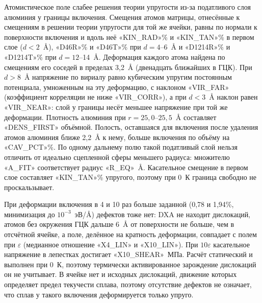 Атомистическое поле слабее решения теории упругости из-за податливого слоя
алюминия у границы включения. Смещения атомов
матрицы, отнесённые к смещениям в решении теории упругости для той же ячейки,
равны по нормали к поверхности включения и вдоль неё «KIN_RAD»\% и «KIN_TAN»\%
в первом слое ($d<2$~\AA), «D46R»\% и «D46T»\% при $d=4$--6~\AA{}
и «D1214R»\% и «D1214T»\% при $d=12$--14~\AA. Деформация каждого атома
найдена по смещениям его соседей в пределах 3{,}2~\AA{} (двенадцать ближайших в ГЦК). При $d>8$~\AA{}
напряжение по вириалу равно кубическим упругим постоянным потенциала,
умноженным на эту деформацию, с наклоном «VIR_FAR» (коэффициент корреляции
не ниже «VIR_CORR»), а при $d<3$~\AA{} наклон равен «VIR_NEAR»: слой у границы
несёт меньшее напряжение при той же деформации. Плотность алюминия при
$r=25{,}0$--$25{,}5$~\AA{} составляет «DENS_FIRST» объёмной. Полость, оставшаяся
для включения после удаления атомов алюминия ближе 2{,}2~\AA{} к нему, больше
включения по объёму на «CAV_PCT»\%. По одному дальнему полю такой податливый слой
нельзя отличить от идеально сцепленной сферы меньшего радиуса: множителю
«A_FIT» соответствует радиус «R_EQ»~\AA. Касательное смещение в первом слое
составляет «KIN_TAN»\% упругого, поэтому при 0~К граница свободно не
проскальзывает.

При деформации включения в 4 и 10 раз больше заданной (0{,}78 и 1{,}94\%,
минимизация до $10^{-3}$~эВ/\AA) дефектов тоже нет: DXA не находит
дислокаций, атомов без окружения ГЦК дальше 6~\AA{} от поверхности не больше,
чем в отсчётной ячейке, а поле, делённое на кратность деформации, совпадает
с полем при $\varepsilon$ (медианное отношение «X4_LIN» и «X10_LIN»). При
$10\varepsilon$ касательное напряжение в лепестках достигает «X10_SHEAR»~МПа.
Расчёт статический и выполнен при 0~К, поэтому термически активированное
зарождение дислокаций он не учитывает. В ячейке нет и исходных дислокаций,
движение которых определяет предел текучести сплава, поэтому отсутствие
дефектов не означает, что сплав у такого включения деформируется только
упруго.
